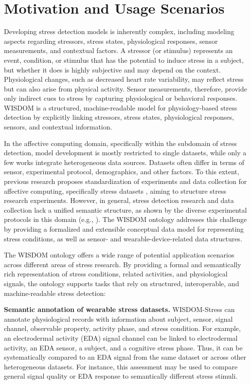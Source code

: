 \documentclass[
]{ceurart}
\begin{document}
\section{Motivation and Usage Scenarios} \label{sec:motivation}
Developing stress detection models is inherently complex, including modeling aspects regarding stressors, stress states, physiological responses, sensor measurements, and contextual factors. A stressor (or stimulus) represents an event, condition, or stimulus that has the potential to induce stress in a subject, but whether it does is highly subjective and may depend on the context. Physiological changes, such as decreased heart rate variability, may reflect stress but can also arise from physical activity. Sensor measurements, therefore, provide only indirect cues to stress by capturing physiological or behavioral responses. WISDOM is a structured, machine-readable model for physiology-based stress detection by explicitly linking stressors, stress states, physiological responses, sensors, and contextual information.

In the affective computing domain, specifically within the subdomain of stress detection, model development is mostly restricted to single datasets, while only a few works integrate heterogeneous data sources. Datasets often differ in terms of sensor, experimental protocol, demographics, and other factors. To this extent, previous research proposes standardization of experiments and data collection for affective computing, specifically stress datasets \cite{schreiber2024trrraced}, aiming to structure stress research experiments. However, in general, stress detection research and data collection lack a unified semantic structure, as shown by the diverse experimental protocols in this domain (e.g., \cite{schmidt2018introducing, gjoreski2016continuous, mishra2020continuous, schreiber2026autostress}). The WISDOM ontology addresses this challenge by providing a formalized and extensible conceptual data model for representing stress conditions, as well as sensor- and wearable-device-related data structures.

The WISDOM ontology offers a wide range of potential application scenarios across different areas of stress research. By providing a formal and semantically rich representation of stress conditions, related activities, and physiological signals, the ontology supports tasks that rely on structured, interoperable, and machine-readable stress detection:

\textbf{Semantic annotation of wearable stress datasets.}
WISDOM-Stress can annotate physiological records with information about subject, sensor, signal channel, observable property, activity phase, and stress condition. For example, an electrodermal activity (EDA) signal channel can be linked to electrodermal activity, an EDA sensor, a subject, and a cognitive stress phase. Thus, it can be systematically compared to an EDA signal from the same dataset or across other heterogeneous datasets. For instance, this assessment may be used to compare general signal quality or EDA response to semantically different stress stimuli.
\end{document}
